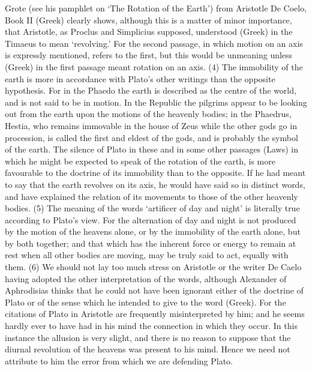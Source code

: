 \documentclass[11pt,letter]{article}
\begin{document}
Grote (see his pamphlet on ‘The Rotation of the Earth’) from Aristotle De Coelo, Book II (Greek) clearly shows, although this is a matter of minor importance, that Aristotle, as Proclus and Simplicius supposed, understood (Greek) in the Timaeus to mean ‘revolving.’ For the second passage, in which motion on an axis is expressly mentioned, refers to the first, but this would be unmeaning unless (Greek) in the first passage meant rotation on an axis. (4) The immobility of the earth is more in accordance with Plato’s other writings than the opposite hypothesis. For in the Phaedo the earth is described as the centre of the world, and is not said to be in motion. In the Republic the pilgrims appear to be looking out from the earth upon the motions of the heavenly bodies; in the Phaedrus, Hestia, who remains immovable in the house of Zeus while the other gods go in procession, is called the first and eldest of the gods, and is probably the symbol of the earth. The silence of Plato in these and in some other passages (Laws) in which he might be expected to speak of the rotation of the earth, is more favourable to the doctrine of its immobility than to the opposite. If he had meant to say that the earth revolves on its axis, he would have said so in distinct words, and have explained the relation of its movements to those of the other heavenly bodies. (5) The meaning of the words ‘artificer of day and night’ is literally true according to Plato’s view. For the alternation of day and night is not produced by the motion of the heavens alone, or by the immobility of the earth alone, but by both together; and that which has the inherent force or energy to remain at rest when all other bodies are moving, may be truly said to act, equally with them. (6) We should not lay too much stress on Aristotle or the writer De Caelo having adopted the other interpretation of the words, although Alexander of Aphrodisias thinks that he could not have been ignorant either of the doctrine of Plato or of the sense which he intended to give to the word (Greek). For the citations of Plato in Aristotle are frequently misinterpreted by him; and he seems hardly ever to have had in his mind the connection in which they occur. In this instance the allusion is very slight, and there is no reason to suppose that the diurnal revolution of the heavens was present to his mind. Hence we need not attribute to him the error from which we are defending Plato.
\end{document}
